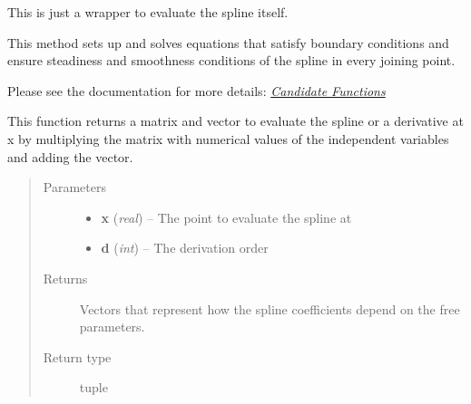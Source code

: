 \documentclass[letterpaper,10pt,english]{sphinxmanual}
\begin{document}
\begin{fulllineitems}
\begin{fulllineitems}
\label{pytrajectory:pytrajectory.spline.CubicSpline.f}
This is just a wrapper to evaluate the spline itself.

\end{fulllineitems}


\begin{fulllineitems}
\label{pytrajectory:pytrajectory.spline.CubicSpline.makesteady}
This method sets up and solves equations that satisfy boundary conditions and
ensure steadiness and smoothness conditions of the spline in every joining point.

Please see the documentation for more details: {\hyperref[guide/background:candidate-functions]{\emph{Candidate Functions}}}

\end{fulllineitems}


\begin{fulllineitems}
\label{pytrajectory:pytrajectory.spline.CubicSpline.prov_evalf}
This function returns a matrix and vector to evaluate the spline or a derivative at x
by multiplying the matrix with numerical values of the independent variables
and adding the vector.
\begin{quote}\begin{description}
\item[{Parameters}] \leavevmode\begin{itemize}
\item {} 
\textbf{x} (\emph{real}) -- The point to evaluate the spline at

\item {} 
\textbf{d} (\emph{int}) -- The derivation order

\end{itemize}

\item[{Returns}] \leavevmode
Vectors that represent how the spline coefficients depend on the free parameters.

\item[{Return type}] \leavevmode
tuple

\end{description}\end{quote}


\end{fulllineitems}
\end{fulllineitems}
\end{document}
